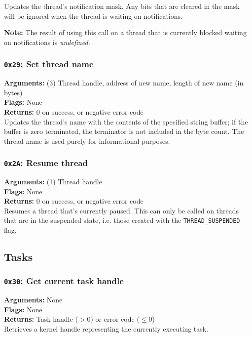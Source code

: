 \documentclass[11pt]{article}
\begin{document}
Updates the thread's notification mask. Any bits that are cleared in the mask will be ignored when the thread is waiting on notifications.

\textbf{Note:} The result of using this call on a thread that is currently blocked waiting on notifications is \textit{undefined.}

\subsubsection{{\tt 0x29}: Set thread name}
\textbf{Arguments:} (3) Thread handle, address of new name, length of new name (in bytes) \\
\textbf{Flags:} None \\
\textbf{Returns:} 0 on success, or negative error code \\

Updates the thread's name with the contents of the specified string buffer; if the buffer is zero terminated, the terminator is not included in the byte count. The thread name is used purely for informational purposes. 

\subsubsection{{\tt 0x2A}: Resume thread}
\textbf{Arguments:} (1) Thread handle \\
\textbf{Flags:} None \\
\textbf{Returns:} 0 on success, or negative error code \\

Resumes a thread that's currently paused. This can only be called on threads that are in the suspended state, i.e. those created with the \texttt{THREAD\_SUSPENDED} flag.

\newpage
\subsection{Tasks}
\subsubsection{{\tt 0x30}: Get current task handle}
\textbf{Arguments:} None \\
\textbf{Flags:} None \\
\textbf{Returns:} Task handle ($>0$) or error code ($\leq0$) \\

Retrieves a kernel handle representing the currently executing task.
\end{document}
